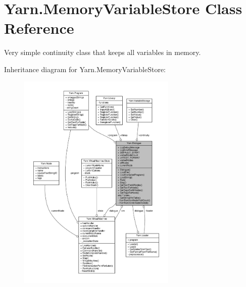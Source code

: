 \hypertarget{a00130}{\section{Yarn.\-Memory\-Variable\-Store Class Reference}
\label{a00130}
}


Very simple continuity class that keeps all variables in memory.  




Inheritance diagram for Yarn.\-Memory\-Variable\-Store\-:
\nopagebreak
\begin{figure}[H]
\begin{center}
\leavevmode
\includegraphics[width=214pt]{a00587}
\end{center}
\end{figure}


